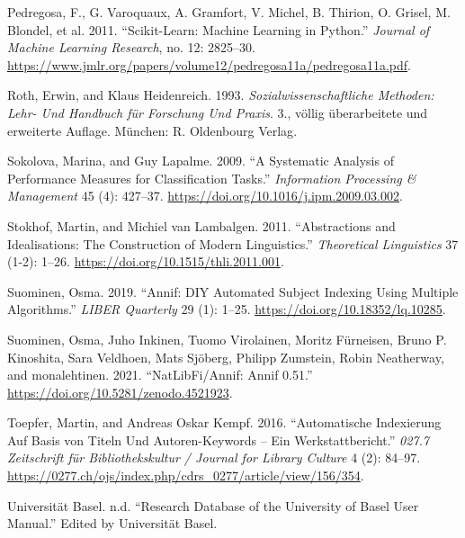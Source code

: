 \begin{CSLReferences}{1}{0}
\leavevmode\hypertarget{ref-Pedregosa.2011}{}%
Pedregosa, F., G. Varoquaux, A. Gramfort, V. Michel, B. Thirion, O.
Grisel, M. Blondel, et al. 2011. {``Scikit-Learn: Machine Learning in
Python.''} \emph{Journal of Machine Learning Research}, no. 12:
2825--30.
\url{https://www.jmlr.org/papers/volume12/pedregosa11a/pedregosa11a.pdf}.

\leavevmode\hypertarget{ref-Roth.1993}{}%
Roth, Erwin, and Klaus Heidenreich. 1993. \emph{Sozialwissenschaftliche
Methoden: Lehr- Und Handbuch f{ü}r Forschung Und Praxis}. 3., v{ö}llig
{ü}berarbeitete und erweiterte Auflage. M{ü}nchen: {R. Oldenbourg
Verlag}.

\leavevmode\hypertarget{ref-Sokolova.2009}{}%
Sokolova, Marina, and Guy Lapalme. 2009. {``A Systematic Analysis of
Performance Measures for Classification Tasks.''} \emph{Information
Processing {\&} Management} 45 (4): 427--37.
\url{https://doi.org/10.1016/j.ipm.2009.03.002}.

\leavevmode\hypertarget{ref-Stokhof.2011}{}%
Stokhof, Martin, and Michiel van Lambalgen. 2011. {``Abstractions and
Idealisations: The Construction of Modern Linguistics.''}
\emph{Theoretical Linguistics} 37 (1-2): 1--26.
\url{https://doi.org/10.1515/thli.2011.001}.

\leavevmode\hypertarget{ref-Suominen.2019}{}%
Suominen, Osma. 2019. {``Annif: DIY Automated Subject Indexing Using
Multiple Algorithms.''} \emph{LIBER Quarterly} 29 (1): 1--25.
\url{https://doi.org/10.18352/lq.10285}.

\leavevmode\hypertarget{ref-Suominen.2021}{}%
Suominen, Osma, Juho Inkinen, Tuomo Virolainen, Moritz Fürneisen, Bruno
P. Kinoshita, Sara Veldhoen, Mats Sjöberg, Philipp Zumstein, Robin
Neatherway, and monalehtinen. 2021. {``NatLibFi/Annif: Annif 0.51.''}
\url{https://doi.org/10.5281/zenodo.4521923}.

\leavevmode\hypertarget{ref-Toepfer.2016}{}%
Toepfer, Martin, and Andreas Oskar Kempf. 2016. {``Automatische
Indexierung Auf Basis von Titeln Und Autoren-Keywords -- Ein
Werkstattbericht.''} \emph{027.7 Zeitschrift f{ü}r Bibliothekskultur /
Journal for Library Culture} 4 (2): 84--97.
\url{https://0277.ch/ojs/index.php/cdrs_0277/article/view/156/354}.

\leavevmode\hypertarget{ref-UniversitatBasel.2021}{}%
Universität Basel. n.d. {``Research Database of the University of Basel
User Manual.''} Edited by Universität Basel.

\end{CSLReferences}
